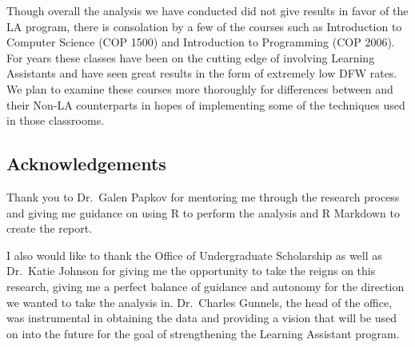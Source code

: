 \documentclass[]{article}
\begin{document}
Though overall the analysis we have conducted did not give results in
favor of the LA program, there is consolation by a few of the courses
such as Introduction to Computer Science (COP 1500) and Introduction to
Programming (COP 2006). For years these classes have been on the cutting
edge of involving Learning Assistants and have seen great results in the
form of extremely low DFW rates. We plan to examine these courses more
thoroughly for differences between and their Non-LA counterparts in
hopes of implementing some of the techniques used in those classrooms.

\hypertarget{acknowledgements}{%
\subsection{Acknowledgements}\label{acknowledgements}}

Thank you to Dr.~Galen Papkov for mentoring me through the research
process and giving me guidance on using R to perform the analysis and R
Markdown to create the report.

I also would like to thank the Office of Undergraduate Scholarship as
well as Dr.~Katie Johnson for giving me the opportunity to take the
reigns on this research, giving me a perfect balance of guidance and
autonomy for the direction we wanted to take the analysis in.
Dr.~Charles Gunnels, the head of the office, was instrumental in
obtaining the data and providing a vision that will be used on into the
future for the goal of strengthening the Learning Assistant program.



\end{document}
